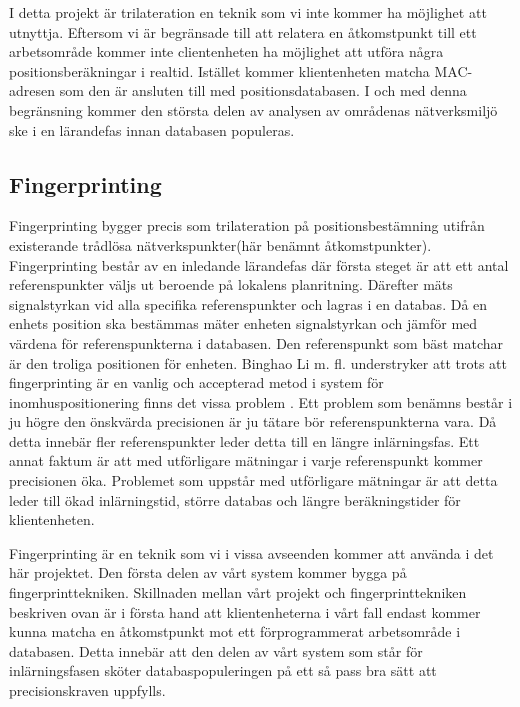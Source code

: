 \documentclass[swedish, a4paper,12pt]{article}
\begin{document}
I detta projekt är trilateration en teknik som vi inte kommer ha möjlighet att utnyttja. Eftersom vi är begränsade till att relatera en åtkomstpunkt till ett arbetsområde kommer inte clientenheten ha möjlighet att utföra några positionsberäkningar i realtid. Istället kommer klientenheten matcha MAC-adresen som den är ansluten till med positionsdatabasen. I och med denna begränsning kommer den största delen av analysen av områdenas nätverksmiljö ske i en lärandefas innan databasen populeras.
\subsection{Fingerprinting}
Fingerprinting bygger precis som trilateration på positionsbestämning utifrån existerande trådlösa nätverkspunkter(här benämnt åtkomstpunkter). Fingerprinting består av en inledande lärandefas där första steget är att ett antal referenspunkter väljs ut beroende på lokalens planritning. Därefter mäts signalstyrkan vid alla specifika referenspunkter och lagras i en databas.%
Då en enhets position ska bestämmas mäter enheten signalstyrkan och jämför med värdena för referenspunkterna i databasen. Den referenspunkt som bäst matchar är den troliga positionen för enheten.\cite{IP1}\cite{jun2018low}
Binghao Li m. fl. understryker att trots att fingerprinting är en vanlig och accepterad metod i system för inomhuspositionering finns det vissa problem .\cite{IP1}
Ett problem som benämns består i ju högre den önskvärda precisionen är ju tätare bör referenspunkterna vara. Då detta innebär fler referenspunkter leder detta till en längre inlärningsfas. Ett annat faktum är att med utförligare mätningar i varje referenspunkt kommer precisionen öka. Problemet som uppstår med utförligare mätningar är att detta leder till ökad inlärningstid, större databas och längre beräkningstider för klientenheten.\cite{IP1}

Fingerprinting är en teknik som vi i vissa avseenden kommer att använda i det här projektet. Den första delen av vårt system kommer bygga på fingerprinttekniken. Skillnaden mellan vårt projekt och fingerprinttekniken beskriven ovan är i första hand att klientenheterna i vårt fall endast kommer kunna matcha en åtkomstpunkt mot ett förprogrammerat arbetsområde i databasen. Detta innebär att den delen av vårt system som står för inlärningsfasen sköter databaspopuleringen på ett så pass bra sätt att precisionskraven uppfylls.
\fi
\end{document}
